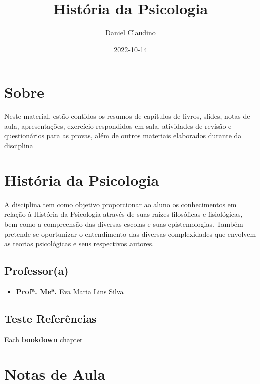 \documentclass[
]{book}
\title{História da Psicologia}
\author{Daniel Claudino}
\date{2022-10-14}
\providecommand{\tightlist}{%
  \setlength{\itemsep}{0pt}\setlength{\parskip}{0pt}}
\theoremstyle{definition}
\theoremstyle{definition}
\theoremstyle{definition}
\theoremstyle{definition}
\theoremstyle{remark}
\begin{document}
\maketitle

{
\setcounter{tocdepth}{1}
\tableofcontents
}
\hypertarget{sobre}{%
\chapter{Sobre}\label{sobre}}

Neste material, estão contidos os resumos de capítulos de livros, slides, notas de aula, apresentações, exercício respondidos em sala, atividades de revisão e questionários para as provas, além de outros materiais elaborados durante da disciplina

\hypertarget{histuxf3ria-da-psicologia}{%
\chapter{História da Psicologia}\label{histuxf3ria-da-psicologia}}

A disciplina tem como objetivo proporcionar ao aluno os conhecimentos em relação à História da Psicologia através de suas raízes filosóficas e fisiológicas, bem como a compreensão das diversas escolas e suas epistemologias. Também pretende-se oportunizar o entendimento das diversas complexidades que envolvem as teorias psicológicas e seus respectivos autores.

\hypertarget{professora}{%
\section*{Professor(a)}\label{professora}}

\begin{itemize}
\tightlist
\item
  \textbf{Profª. Meª.} Eva Maria Lins Silva
\end{itemize}

\hypertarget{teste-referuxeancias}{%
\section{Teste Referências}\label{teste-referuxeancias}}

Each \textbf{bookdown} chapter \citep{book}

\hypertarget{notas-de-aula}{%
\chapter{Notas de Aula}\label{notas-de-aula}}
\end{document}
